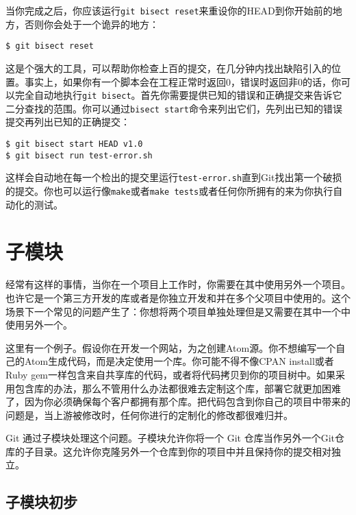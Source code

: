 \documentclass[a4paper]{book}
\begin{document}
当你完成之后，你应该运行\texttt{git bisect reset}来重设你的HEAD到你开始前的地方，否则你会处于一个诡异的地方：

\begin{shaded}\begin{verbatim}
$ git bisect reset
\end{verbatim}\end{shaded}

这是个强大的工具，可以帮助你检查上百的提交，在几分钟内找出缺陷引入的位置。事实上，如果你有一个脚本会在工程正常时返回0，错误时返回非0的话，你可以完全自动地执行\texttt{git bisect}。首先你需要提供已知的错误和正确提交来告诉它二分查找的范围。你可以通过\texttt{bisect start}命令来列出它们，先列出已知的错误提交再列出已知的正确提交：

\begin{shaded}\begin{verbatim}
$ git bisect start HEAD v1.0
$ git bisect run test-error.sh
\end{verbatim}\end{shaded}

这样会自动地在每一个检出的提交里运行\texttt{test-error.sh}直到Git找出第一个破损的提交。你也可以运行像\texttt{make}或者\texttt{make tests}或者任何你所拥有的来为你执行自动化的测试。

\section{子模块}

经常有这样的事情，当你在一个项目上工作时，你需要在其中使用另外一个项目。也许它是一个第三方开发的库或者是你独立开发和并在多个父项目中使用的。这个场景下一个常见的问题产生了：你想将两个项目单独处理但是又需要在其中一个中使用另外一个。

这里有一个例子。假设你在开发一个网站，为之创建Atom源。你不想编写一个自己的Atom生成代码，而是决定使用一个库。你可能不得不像CPAN install或者Ruby gem一样包含来自共享库的代码，或者将代码拷贝到你的项目树中。如果采用包含库的办法，那么不管用什么办法都很难去定制这个库，部署它就更加困难了，因为你必须确保每个客户都拥有那个库。把代码包含到你自己的项目中带来的问题是，当上游被修改时，任何你进行的定制化的修改都很难归并。

Git 通过子模块处理这个问题。子模块允许你将一个 Git 仓库当作另外一个Git仓库的子目录。这允许你克隆另外一个仓库到你的项目中并且保持你的提交相对独立。

\subsection{子模块初步}
\end{document}
